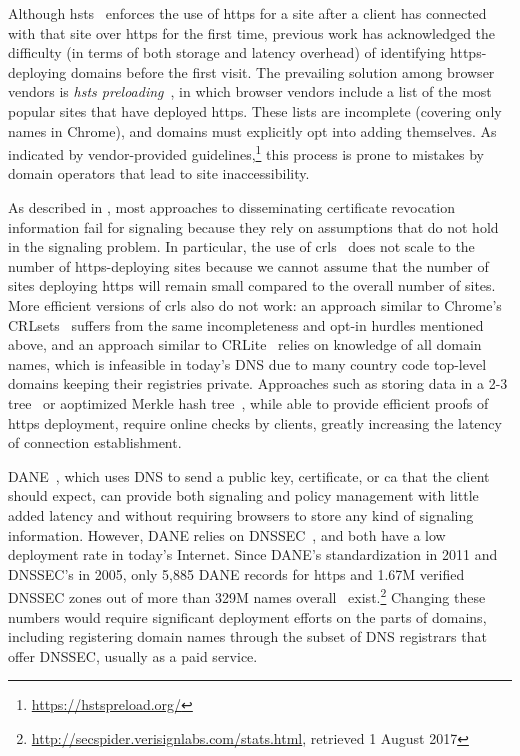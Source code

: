 Although \ac{hsts}~\cite{rfc6797} enforces the use of \ac{https} for a site
after a client has connected with that site over \ac{https} for the first time,
previous work has acknowledged the difficulty (in terms of both storage and
latency overhead) of identifying \ac{https}-deploying domains before the first
visit. The prevailing solution among browser vendors is \emph{\ac{hsts}
preloading}~\cite{keeler2012preloading}, in which browser vendors include a list
of the most popular sites that have deployed \ac{https}. These lists are
incomplete (covering only  names in Chrome), and domains
must explicitly opt into adding themselves. As indicated by vendor-provided
guidelines,\footnote{\url{https://hstspreload.org/}} this process is prone to
mistakes by domain operators that lead to site inaccessibility.

As described in ,
most approaches to disseminating certificate revocation information fail for
signaling because they rely on assumptions that do not hold in the signaling
problem. In particular, the use of \acp{crl}~\cite{rfc5280} does not scale to
the number of \ac{https}-deploying sites because we cannot assume that the
number of sites deploying \ac{https} will remain small compared to the overall
number of sites. More efficient versions of \acp{crl} also do not work: an
approach similar to Chrome's CRLsets~\cite{langley2012revocation} suffers from
the same incompleteness and opt-in hurdles mentioned above, and an approach
similar to CRLite~\cite{larisch2017crlite} relies on knowledge of all domain
names, which is infeasible in today's DNS due to many country code top-level
domains keeping their registries private. Approaches such as storing data in a
2-3 tree~\cite{naor1998certificate} or aoptimized Merkle hash
tree~\cite{laurie2012revocation}, while able to provide efficient proofs of
\ac{https} deployment, require online checks by clients, greatly increasing the
latency of connection establishment.

DANE~\cite{rfc6698}, which uses DNS to send a public key, certificate, or
\ac{ca} that the client should expect, can provide both signaling and policy
management with little added latency and without requiring browsers to store any
kind of signaling information. However, DANE relies on DNSSEC~\cite{rfc4033},
and both have a low deployment rate in today's Internet. Since DANE's
standardization in 2011 and DNSSEC's in 2005, only 5,885 DANE records for
\ac{https} and 1.67M verified DNSSEC zones out of more than 329M names
overall~\cite{dnib-14-1}
exist.\footnote{\url{http://secspider.verisignlabs.com/stats.html}, retrieved 1
August 2017} Changing these numbers would require significant deployment efforts
on the parts of domains, including registering domain names through the subset
of DNS registrars that offer DNSSEC, usually as a paid service.
